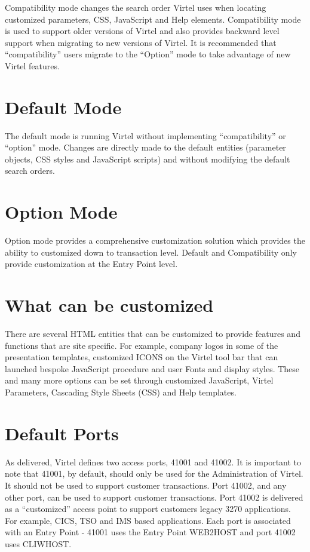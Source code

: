 \documentclass[letterpaper,10pt,english]{sphinxmanual}
\begin{document}
Compatibility mode changes the search order Virtel uses when locating customized parameters, CSS, JavaScript and Help elements. Compatibility mode is used to support older versions of Virtel and also provides backward level support when migrating to new versions of Virtel. It is recommended that “compatibility” users migrate to the “Option” mode to take advantage of new Virtel features.


\section{Default Mode}
\label{\detokenize{TN202002:default-mode}}
The default mode is running Virtel without implementing “compatibility” or “option” mode. Changes are directly made to the default entities (parameter objects, CSS styles and JavaScript scripts) and without modifying the default search orders.


\section{Option Mode}
\label{\detokenize{TN202002:option-mode}}
Option mode provides a comprehensive customization solution which provides the ability to customized down to transaction level. Default and Compatibility only provide customization at the Entry Point level.


\section{What can be customized}
\label{\detokenize{TN202002:what-can-be-customized}}
There are several HTML entities that can be customized to provide features and functions that are site specific. For example, company logos in some of the presentation templates, customized ICONS on the Virtel tool bar that can launched bespoke JavaScript procedure and user Fonts and display styles. These and many more options can be set through customized JavaScript, Virtel Parameters, Cascading Style Sheets (CSS) and Help templates.


\section{Default Ports}
\label{\detokenize{TN202002:default-ports}}
As delivered, Virtel defines two access ports, 41001 and 41002. It is important to note that 41001, by default, should only be used for the Administration of Virtel. It should not be used to support customer transactions. Port 41002, and any other port, can be used to support customer transactions. Port 41002 is delivered as a “customized” access point to support customers legacy 3270 applications. For example, CICS, TSO and IMS based applications. Each port is associated with an Entry Point - 41001 uses the Entry Point WEB2HOST and port 41002 uses CLIWHOST.
\end{document}
